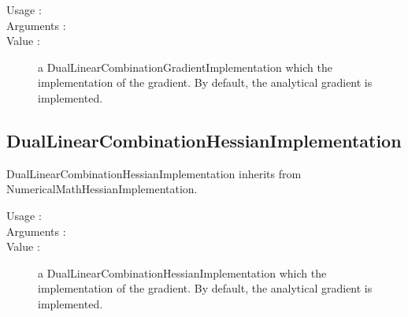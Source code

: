 \begin{description}

\item[Usage :]   \rule{0pt}{1em}

\item[Arguments :]  \rule{0pt}{1em}


\item[Value :] a  DualLinearCombinationGradientImplementation which the implementation of the gradient. By default, the analytical gradient is implemented.

\end{description}




\newpage
\subsection{DualLinearCombinationHessianImplementation}


DualLinearCombinationHessianImplementation inherits from NumericalMathHessianImplementation.

\begin{description}

\item[Usage :]   \rule{0pt}{1em}

\item[Arguments :]  \rule{0pt}{1em}


\item[Value :] a  DualLinearCombinationHessianImplementation which the implementation of the gradient. By default, the analytical gradient is implemented.

\end{description}


